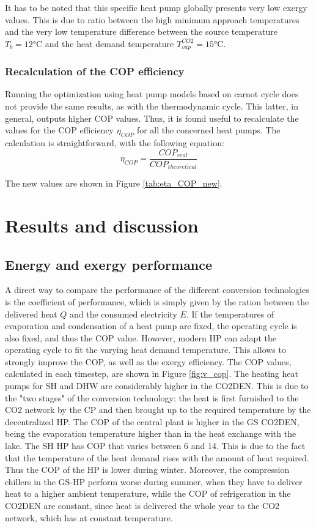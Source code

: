 \documentclass{article}
\begin{document}
It has to be noted that this specific heat pump globally presents very low  exergy values. This is due to ratio between the high minimum approach temperatures and the very low temperature difference between the source temperature $T_{b} = 12 \si{\celsius}$ and the heat demand temperature $T_{vap}^{CO2} = 15 \si{\celsius}$.

\subsubsection{Recalculation of the COP efficiency}
Running the optimization using heat pump models based on carnot cycle does not provide the same results, as with the thermodynamic cycle. This latter, in general, outputs higher COP values. Thus, it is found useful to recalculate the values for the COP efficiency $\eta_{COP}$ for all the concerned heat pumps. The calculation is straightforward, with the following equation:
\begin{equation}
\eta_{COP} = \frac{COP_{real}}{COP_{theoretical}}
\end{equation}



The new values are shown in Figure \ref{tab:eta_COP_new}.


\newpage
\section{Results and discussion}

\subsection{Energy and exergy performance}

A direct way to compare the performance of the different conversion technologies is the coefficient of performance, which is simply given by the ration between the delivered heat $Q$ and the consumed electricity $E$. If the temperatures of evaporation and condensation of a heat pump are fixed, the operating cycle is also fixed, and thus the COP value. However, modern HP can adapt the operating cycle to fit the varying heat demand temperature. This allows to strongly improve the COP, as well as the exergy efficiency. The COP values, calculated in each timestep, are shown in Figure \ref{fig:v_cop}. 
The heating heat pumps for SH and DHW are considerably higher in the CO2DEN. This is due to the "two stages" of the conversion technology: the heat is first furnished to the CO2 network by the CP and then brought up to the required temperature by the decentralized HP. 
The COP of the central plant is higher in the GS CO2DEN, being the evaporation temperature higher than in the heat exchange with the lake. 
The SH HP has COP that varies between 6 and 14. This is due to the fact that the temperature of the heat demand rises with the amount of heat required. Thus the COP of the HP is lower during winter.
Moreover, the compression chillers in the GS-HP perform worse during summer, when they have to deliver heat to a higher ambient temperature, while the COP of refrigeration in the CO2DEN are constant, since heat is delivered the whole year to the CO2 network, which has at constant temperature.
\end{document}
